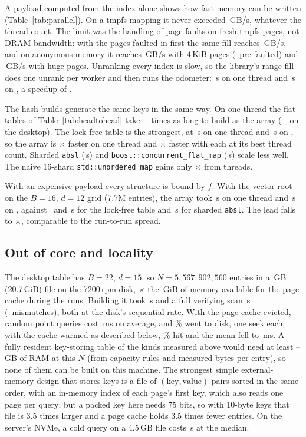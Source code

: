 \documentclass[preprint,12pt]{elsarticle}
\newcommand{\umap}{\texttt{std::\allowbreak unordered\_\allowbreak map}}
\newcommand{\bconc}{\texttt{boost::\allowbreak concurrent\_\allowbreak flat\_\allowbreak map}}
\begin{document}
A payload computed from the index alone shows how fast memory can be written (Table~\ref{tab:parallel}). On a tmpfs mapping it never exceeded \hShmGBs\,GB/s, whatever the thread count. The limit was the handling of page faults on fresh tmpfs pages, not DRAM bandwidth: with the pages faulted in first the same fill reaches \hShmPfGBs\,GB/s, and on anonymous memory it reaches \hFourGBs\,GB/s with 4\,KiB pages (\hFourPfGBs\ pre-faulted) and \hAnonGBs\,GB/s with huge pages. Unranking every index is slow, so the library's range fill does one unrank per worker and then runs the odometer: \hParArrOne\,s on one thread and \hParArrSf\,s on \hParArrSfT, a speedup of \hParArray.

The hash builds generate the same keys in the same way. On one thread the flat tables of Table~\ref{tab:headtohead} take \hBuildFlatLo--\hBuildFlatHi\ times as long to build as the array (\hBuildFlatLoD--\hBuildFlatHiD\ on the desktop). The lock-free table is the strongest, at \hParCasOne\,s on one thread and \hParCasSf\,s on \hParCasSfT, so the array is \hParRatioOne$\times$ faster on one thread and \hParRatio$\times$ faster with each at its best thread count. Sharded \texttt{absl} (\hParAbslShSf\,s) and \bconc{}
(\hParBoostCSf\,s) scale less well. The naive 16-shard \umap{} gains only
\hParNaiveScale$\times$ from threads. 

With an expensive payload every structure is bound by $f$. With the vector root on the $B=16$, $d=12$ grid (7.7M entries), the array took
\hParPlArrOne\,s on one thread and \hParPlArr\,s on \hParT, against \hParPlCasOne\
and \hParPlCas\,s for the lock-free table and \hParPlAbsl\,s for sharded
\texttt{absl}. The lead falls to \hParPlRatio$\times$, comparable to the run-to-run spread.

\subsection{Out of core and locality}\label{sec:ooc}
The desktop table has $B=22$, $d=15$, so $N=5{,}567{,}902{,}560$ entries in a \hOocGB\,GB (20.7\,GiB) file on the 7200\,rpm disk, \hOocCacheRatio$\times$ the
\hDeskAvail\,GiB of memory available for the page cache during the runs. Building it took \hOocBuildS\,s
and a full verifying scan \hOocScanS\,s (\hOocScanBad\ mismatches), both at the
disk's sequential rate. With the page cache evicted, random point queries cost \hOocColdMean\,ms on average, and \hOocColdMiss\% went to disk, one seek each; with the cache warmed as described below, \hOocWarmHit\% hit and the mean fell to \hOocWarmMs\,ms. A
fully resident key-storing table of the kinds measured above would need at least
\hOocKeyLo--\hOocKeyHi\,GB of RAM at this $N$ (from capacity rules and measured bytes per entry), so none of them can be built on
this machine. The strongest simple external-memory design that stores keys is a file of $(\text{key},\text{value})$ pairs sorted in the same order, with an in-memory index of each page's first key,\cite{comer1979} which also reads one page per query; but a packed key here needs 75 bits, so with 10-byte keys that file is 3.5 times larger and a page cache holds 3.5 times fewer entries. On the server's NVMe, a cold query on a
4.5\,GB file costs \hNvmeColdUs\,\textmu s at the
median.
\end{document}
